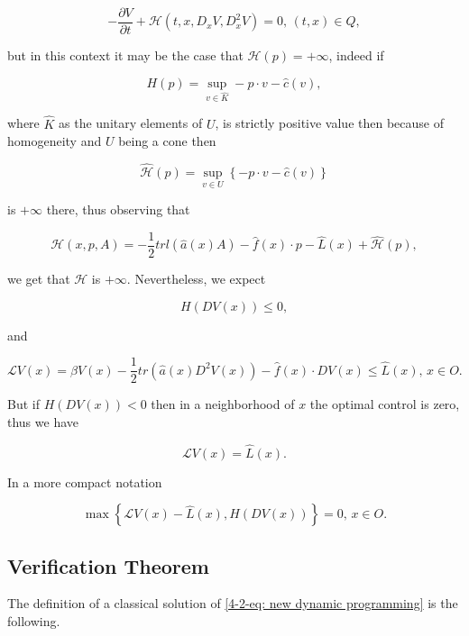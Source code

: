 \[-\frac{\partial V}{\partial t} + \mathcal{H}(t,x,D_x V,D_x^2 V)=0,\,(t,x)\in Q,\]

but in this context it may be the case that $\mathcal{H}(p)=+\infty$, indeed if 

\begin{equation}\label{4-2-eq: H definition}
    H(p) = \sup_{v\in\hat{K}}-p\cdot v-\hat{c}(v),
\end{equation}

where $\hat{K}$ as the unitary elements of $U$, is strictly positive value then because of homogeneity and $U$ being a cone then

\begin{equation}
    \hat{\mathcal{H}}(p)=\sup_{v\in U}\left\{-p\cdot v - \hat{c}(v)\right\}
\end{equation}

is $+\infty$ there, thus observing that

\[\mathcal{H}(x,p,A) = -\frac{1}{2}trl\left(\hat{a}(x)A\right) - \hat{f}(x)\cdot p - \hat{L}(x) + \hat{\mathcal{H}}(p),\]

we get that $\mathcal{H}$ is $+\infty$. Nevertheless, we expect

\begin{equation}
    H(DV(x)) \leq 0,
\end{equation}

and 

\begin{equation}
    \mathcal{L}V(x) = \beta V(x) - \frac{1}{2}tr\left(\hat{a}(x)D^2V(x)\right) - \hat{f}(x)\cdot DV(x)\leq \hat{L}(x), \, x\in O.
\end{equation}

But if $H(DV(x))<0$ then in a neighborhood of $x$ the optimal control is zero, thus we have

\[\mathcal{L}V(x)=\hat{L}(x).\]

In a more compact notation

\begin{equation}\label{4-2-eq: new dynamic programming}
    \max\left\{\mathcal{L}V(x)-\hat{L}(x),H(DV(x))\right\} = 0,\, x\in O.
\end{equation}

\subsection{Verification Theorem}

The definition of a classical solution of \eqref{4-2-eq: new dynamic programming} is the following.

